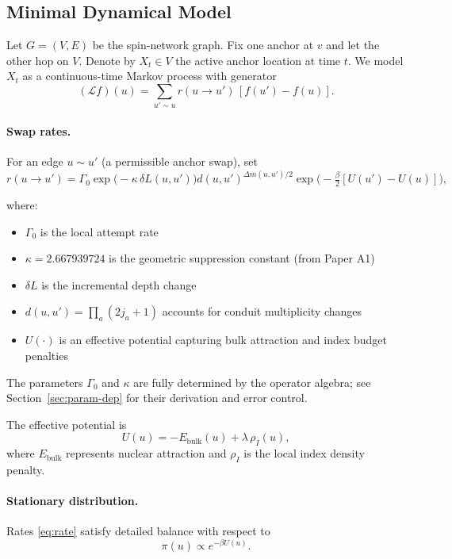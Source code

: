 \documentclass[11pt]{article}
\theoremstyle{plain}
\theoremstyle{definition}
\begin{document}
\subsection{Minimal Dynamical Model}
\label{subsec:brachiation-dynamics}

Let $G=(V,E)$ be the spin-network graph. Fix one anchor at $v$ and let the other hop on $V$. Denote by $X_t\in V$ the active anchor location at time $t$. We model $X_t$ as a continuous-time Markov process with generator
\[
  (\mathcal{L}f)(u) = \sum_{u'\sim u} r(u\to u')\,[f(u')-f(u)].
\]

\paragraph{Swap rates.}
For an edge $u\sim u'$ (a permissible anchor swap), set
\begin{equation}
  r(u\to u') = \Gamma_0 \exp\!\Big(-\kappa\,\delta L(u,u')\Big) d(u,u')^{\Delta m(u,u')/2} \exp\!\Big(-\tfrac{\beta}{2}[U(u')-U(u)]\Big),
  \label{eq:rate}
\end{equation}

where:
\begin{itemize}
  \item $\Gamma_0$ is the local attempt rate
  \item $\kappa = 2.667939724$ is the geometric suppression constant (from Paper A1)
  \item $\delta L$ is the incremental depth change
  \item $d(u,u')=\prod_a(2j_a+1)$ accounts for conduit multiplicity changes
  \item $U(\cdot)$ is an effective potential capturing bulk attraction and index budget penalties
\end{itemize}

The parameters $\Gamma_0$ and $\kappa$ are fully determined by the
operator algebra; see Section~\ref{sec:param-dep} for their derivation
and error control.

The effective potential is
\[
  U(u) = -E_{\mathrm{bulk}}(u) + \lambda\,\rho_I(u),
\]
where $E_{\mathrm{bulk}}$ represents nuclear attraction and $\rho_I$ is the local index density penalty.

\paragraph{Stationary distribution.}
Rates \eqref{eq:rate} satisfy detailed balance with respect to
\[
  \pi(u) \propto e^{-\beta U(u)}.
\]
\end{document}
